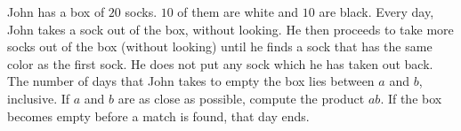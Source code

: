 John has a box of $20$ socks. $10$ of them are white and $10$ are black. Every day, John takes a sock out of the box, without looking. He then proceeds to take more socks out of the box (without looking) until he finds a sock that has the same color as the first sock. He does not put any sock which he has taken out back. The number of days that John takes to empty the box lies between $a$ and $b$, inclusive. If $a$ and $b$ are as close as possible, compute the product $ab$. If the box becomes empty before a match is found, that day ends.

